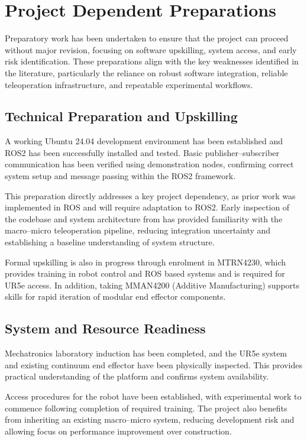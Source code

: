 \documentclass[12pt]{article}
\begin{document}
\section{Project Dependent Preparations}

Preparatory work has been undertaken to ensure that the project can proceed
without major revision, focusing on software upskilling, system access, and
early risk identification. These preparations align with the key weaknesses
identified in the literature, particularly the reliance on robust software
integration, reliable teleoperation infrastructure, and repeatable experimental
workflows.

\subsection{Technical Preparation and Upskilling}

A working Ubuntu 24.04 development environment has been established and ROS2 has been
successfully installed and tested. Basic publisher--subscriber communication has
been verified using demonstration nodes, confirming correct system setup and
message passing within the ROS2 framework.

This preparation directly addresses a key project dependency, as prior work was
implemented in ROS and will require adaptation to ROS2. Early inspection of the codebase and system architecture from 
\textcite{scott2023macro} has provided familiarity with
the macro--micro teleoperation pipeline, reducing integration uncertainty and
establishing a baseline understanding of system structure.

Formal upskilling is also in progress through enrolment in MTRN4230, which
provides training in robot control and ROS based systems and is required for
UR5e access. In addition, taking MMAN4200 (Additive Manufacturing) supports skills for rapid
iteration of modular end effector components.

\subsection{System and Resource Readiness}

Mechatronics laboratory induction has been completed, and the UR5e system and
existing continuum end effector have been physically inspected. This provides
practical understanding of the platform and confirms system availability.

Access procedures for the robot have been established, with experimental work to
commence following completion of required training. The project also benefits
from inheriting an existing macro--micro system, reducing development risk and
allowing focus on performance improvement over construction.
\end{document}
